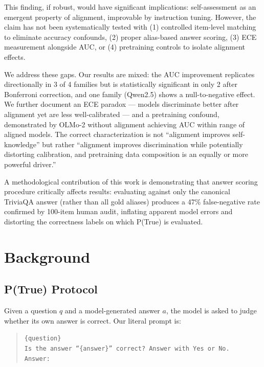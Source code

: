 \documentclass[11pt]{article}
\begin{document}
This finding, if robust, would have significant implications: self-assessment as an emergent property of alignment, improvable by instruction tuning. However, the claim has not been systematically tested with (1) controlled item-level matching to eliminate accuracy confounds, (2) proper alias-based answer scoring, (3) ECE measurement alongside AUC, or (4) pretraining controls to isolate alignment effects.

We address these gaps. Our results are mixed: the AUC improvement replicates directionally in 3 of 4 families but is statistically significant in only 2 after Bonferroni correction, and one family (Qwen2.5) shows a null-to-negative effect. We further document an ECE paradox --- models discriminate better after alignment yet are less well-calibrated --- and a pretraining confound, demonstrated by OLMo-2 without alignment achieving AUC within range of aligned models. The correct characterization is not ``alignment improves self-knowledge'' but rather ``alignment improves discrimination while potentially distorting calibration, and pretraining data composition is an equally or more powerful driver.''

A methodological contribution of this work is demonstrating that answer scoring procedure critically affects results: evaluating against only the canonical TriviaQA answer (rather than all gold aliases) produces a 47\% false-negative rate confirmed by 100-item human audit, inflating apparent model errors and distorting the correctness labels on which P(True) is evaluated.

\section{Background}

\subsection{P(True) Protocol}

Given a question $q$ and a model-generated answer $a$, the model is asked to judge whether its own answer is correct. Our literal prompt is:

\begin{quote}
\texttt{\{question\}}\\[0.5em]
\texttt{Is the answer ``\{answer\}'' correct? Answer with Yes or No.}\\[0.5em]
\texttt{Answer:}
\end{quote}
\end{document}
